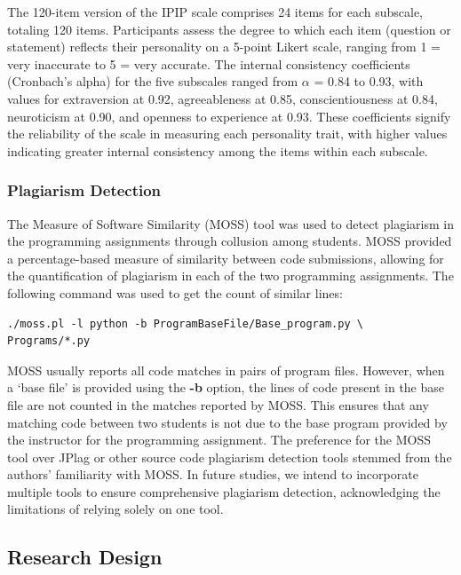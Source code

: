 The 120-item version of the IPIP scale comprises 24 items for each subscale, totaling 120 items. Participants assess the degree to which each item (question or statement) reflects their personality on a 5-point Likert scale, ranging from 1 = very inaccurate to 5 = very accurate. The internal consistency coefficients (Cronbach's alpha) for the five subscales ranged from \begin{math} \alpha \end{math} = 0.84 to 0.93, with values for extraversion at 0.92, agreeableness at 0.85, conscientiousness at 0.84, neuroticism at 0.90, and openness to experience at 0.93. These coefficients signify the reliability of the scale in measuring each personality trait, with higher values indicating greater internal consistency among the items within each subscale.

\subsubsection{Plagiarism Detection}

The Measure of Software Similarity (MOSS) tool \cite{MOSS} was used to detect plagiarism in the programming assignments through collusion among students. MOSS provided a percentage-based measure of similarity between code submissions, allowing for the quantification of plagiarism in each of the two programming assignments. The following command was used to get the count of similar lines: 
\begin{verbatim}
./moss.pl -l python -b ProgramBaseFile/Base_program.py \
Programs/*.py
\end{verbatim}

MOSS usually reports all code matches in pairs of program files. However, when a `base file' is provided using the \textbf{-b} option, the lines of code present in the base file are not counted in the matches reported by MOSS. This ensures that any matching code between two students is not due to the base program provided by the instructor for the programming assignment. The preference for the MOSS tool over JPlag or other source code plagiarism detection tools stemmed from the authors' familiarity with MOSS. In future studies, we intend to incorporate multiple tools to ensure comprehensive plagiarism detection, acknowledging the limitations of relying solely on one tool.

\subsection{Research Design}

